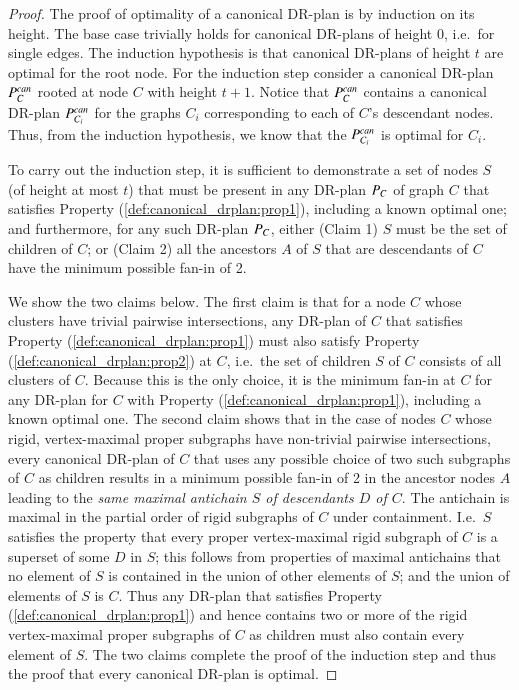 \begin{proof}
    The proof of optimality of a canonical DR-plan is by induction on its height. The base case trivially holds for canonical DR-plans of height 0, i.e.\ for single edges. The induction hypothesis is that canonical DR-plans of height $t$ are optimal for the root node.
    For the induction step consider a canonical DR-plan $P_{C}^{can}$ rooted at node $C$ with height $t+1$.
    Notice that $P_{C}^{can}$ contains a canonical DR-plan $P_{C_i}^{can}$ for the graphs $C_i$ corresponding to each of $C$'s descendant nodes.
    Thus, from the induction hypothesis, we know that the $P_{C_i}^{can}$ is optimal for $C_i$.

    To carry out the induction step, it is sufficient to demonstrate a set of nodes $S$ (of height at most $t$) that must be present in any DR-plan $P_{C}$ of graph $C$ that satisfies Property (\ref{def:canonical_drplan:prop1}), including a known optimal one; and furthermore, for any such DR-plan $P_{C}$, either (Claim 1) $S$ must be the set of children of $C$; or (Claim 2) all the ancestors $A$ of $S$ that are descendants of $C$ have the minimum possible fan-in of 2.

    We show the two claims below.
    The first claim is that for a node $C$ whose clusters have trivial pairwise intersections, any DR-plan of $C$ that satisfies Property (\ref{def:canonical_drplan:prop1}) must also satisfy Property (\ref{def:canonical_drplan:prop2}) at $C$, i.e.\ the set of children $S$ of $C$ consists of all clusters of $C$.
    Because this is the only choice, it is the minimum fan-in at $C$ for any DR-plan for $C$ with Property (\ref{def:canonical_drplan:prop1}), including a known optimal one.
    The second claim shows that in the case of nodes $C$ whose rigid, vertex-maximal proper subgraphs have  non-trivial pairwise intersections, every canonical DR-plan of $C$ that uses any possible choice of two such subgraphs of $C$ as children results in a minimum possible fan-in of 2 in the ancestor nodes $A$ leading to the \emph{same maximal antichain $S$ of descendants $D$ of $C$}. The antichain is maximal in the partial order of rigid subgraphs of $C$ under containment. I.e.\ $S$ satisfies the property that every proper vertex-maximal rigid subgraph of $C$ is a superset of some $D$ in $S$; this follows from properties of maximal antichains that no element of $S$ is contained in the union of other elements of $S$; and the union of elements of $S$ is $C$. Thus any DR-plan that satisfies Property (\ref{def:canonical_drplan:prop1}) and hence contains two or more of the rigid vertex-maximal proper subgraphs of $C$ as children must also contain every element of $S$. The two claims complete the proof of the induction step and thus the proof that every canonical DR-plan is optimal.




\end{proof}
